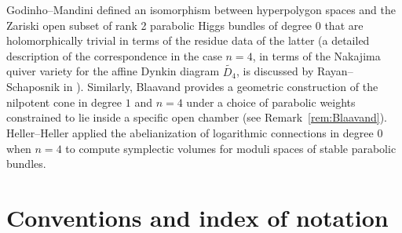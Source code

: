 \documentclass[10pt,a4paper]{amsart}
\numberwithin{equation}{section}
\begin{document}
Godinho--Mandini \cite{GM13,GM21} defined an isomorphism between hyperpolygon spaces and the Zariski open subset of rank 2 parabolic Higgs bundles of degree $0$ that are holomorphically trivial in terms of the residue data of the latter (a detailed description of the correspondence in the case $n=4$, in terms of the Nakajima quiver variety for the affine Dynkin diagram $\tilde{D_{4}}$, is discussed by Rayan--Schaposnik in \cite[Section 4.3]{RS21}). Similarly, Blaavand \cite{Bla15} provides a geometric construction of the nilpotent cone in degree $1$ and $n=4$ under a choice of parabolic weights constrained to lie inside a specific open chamber (see Remark~\ref{rem:Blaavand}). Heller--Heller \cite{HH16} applied the abelianization of logarithmic connections in degree $0$ when $n=4$ to compute symplectic volumes for moduli spaces of stable parabolic bundles.

\section{Conventions and index of notation}\label{sec:conv}
\end{document}
